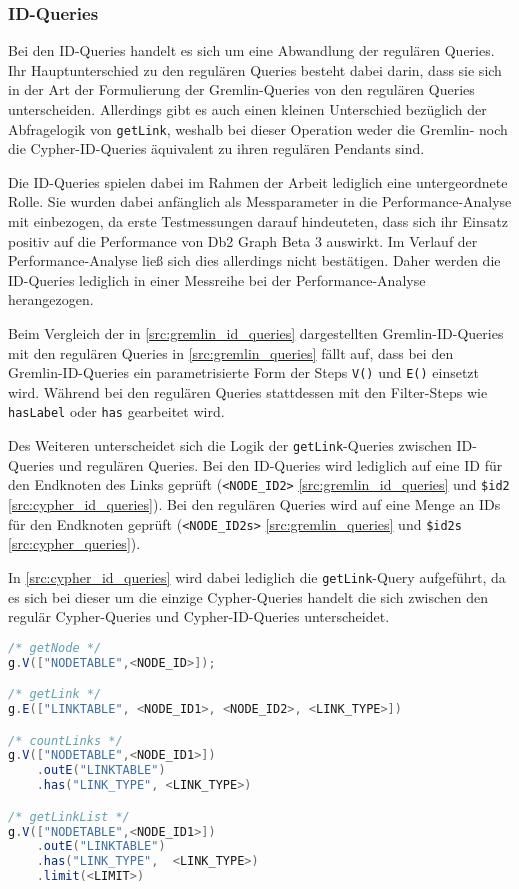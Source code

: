 \subsubsection{ID-Queries}
Bei den ID-Queries handelt es sich um eine Abwandlung der regulären Queries. Ihr Hauptunterschied zu den regulären Queries besteht dabei darin, dass sie sich in der Art der Formulierung der Gremlin-Queries von den regulären Queries unterscheiden. Allerdings gibt es auch einen kleinen Unterschied bezüglich der Abfragelogik von \texttt{getLink}, weshalb bei dieser Operation weder die Gremlin- noch die Cypher-ID-Queries äquivalent zu ihren regulären Pendants sind.

Die ID-Queries spielen dabei im Rahmen der Arbeit lediglich eine untergeordnete Rolle. Sie wurden dabei anfänglich als Messparameter in die Performance-Analyse mit einbezogen, da erste Testmessungen darauf hindeuteten, dass sich ihr Einsatz positiv auf die Performance von Db2 Graph Beta 3 auswirkt. Im Verlauf der Performance-Analyse ließ sich dies allerdings nicht bestätigen. Daher werden die ID-Queries lediglich in einer Messreihe bei der Performance-Analyse herangezogen. 

Beim Vergleich der in \autoref{src:gremlin_id_queries} dargestellten Gremlin-ID-Queries mit den regulären Queries in \autoref{src:gremlin_queries} fällt auf, dass bei den Gremlin-ID-Queries ein parametrisierte Form der Steps \texttt{V()} und \texttt{E()} einsetzt wird. Während bei den regulären Queries stattdessen mit den Filter-Steps wie \texttt{hasLabel} oder \texttt{has} gearbeitet wird.

Des Weiteren unterscheidet sich die Logik der \texttt{getLink}-Queries zwischen ID-Queries und regulären Queries. Bei den ID-Queries wird lediglich auf eine ID für den Endknoten des Links geprüft (\texttt{<NODE\_ID2>} \autoref{src:gremlin_id_queries} und \texttt{\$id2} \autoref{src:cypher_id_queries}). Bei den regulären Queries wird auf eine Menge an IDs für den Endknoten geprüft (\texttt{<NODE\_ID2s>} \autoref{src:gremlin_queries} und \texttt{\$id2s} \autoref{src:cypher_queries}). 

In \autoref{src:cypher_id_queries} wird dabei lediglich die \texttt{getLink}-Query aufgeführt, da es sich bei dieser um die einzige Cypher-Queries handelt die sich zwischen den regulär Cypher-Queries und Cypher-ID-Queries unterscheidet.

\begin{lstlisting}[label=src:gremlin_id_queries,caption={Gremlin ID-Queries},language=Java]
/* getNode */
g.V(["NODETABLE",<NODE_ID>]);

/* getLink */
g.E(["LINKTABLE", <NODE_ID1>, <NODE_ID2>, <LINK_TYPE>])

/* countLinks */
g.V(["NODETABLE",<NODE_ID1>])
    .outE("LINKTABLE")
    .has("LINK_TYPE", <LINK_TYPE>)

/* getLinkList */
g.V(["NODETABLE",<NODE_ID1>])
    .outE("LINKTABLE")
    .has("LINK_TYPE",  <LINK_TYPE>)
    .limit(<LIMIT>)
\end{lstlisting}

